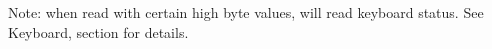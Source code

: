 Note: when read with certain high byte values,  will read keyboard status. See Keyboard, section  for details.


\subsubsection{}


\subsubsection{}
\vspace*{-2ex}
\subsubsection{}
\vspace*{-2ex}
\subsubsection{}
\vspace*{-2ex}
\subsubsection{}
\vspace*{-2ex}
\subsubsection{}
\vspace*{-2ex}
\subsubsection{}



\pagebreak
\IntentionallyEmpty
\pagebreak
